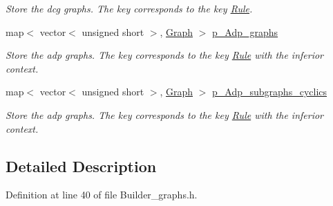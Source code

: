 \begin{DoxyCompactItemize}
\begin{DoxyCompactList}\small\item\em Store the dcg graphs. The key corresponds to the key \hyperlink{classgenevalmag_1_1Rule}{Rule}. \item\end{DoxyCompactList}\item 
map$<$ vector$<$ unsigned short $>$, \hyperlink{namespacegenevalmag_a4a96de9ebfc7d48233406ab9cad55cb5}{Graph} $>$ \hyperlink{classgenevalmag_1_1Builder__graphs_a75e37bb5a6f499fdd57f97061e313ec5}{p\_\-Adp\_\-graphs}
\begin{DoxyCompactList}\small\item\em Store the adp graphs. The key corresponds to the key \hyperlink{classgenevalmag_1_1Rule}{Rule} with the inferior context. \item\end{DoxyCompactList}\item 
map$<$ vector$<$ unsigned short $>$, \hyperlink{namespacegenevalmag_a4a96de9ebfc7d48233406ab9cad55cb5}{Graph} $>$ \hyperlink{classgenevalmag_1_1Builder__graphs_a54a45b424086582d4ed7bb99b948a956}{p\_\-Adp\_\-subgraphs\_\-cyclics}
\begin{DoxyCompactList}\small\item\em Store the adp graphs. The key corresponds to the key \hyperlink{classgenevalmag_1_1Rule}{Rule} with the inferior context. \item\end{DoxyCompactList}\end{DoxyCompactItemize}


\subsection{Detailed Description}


Definition at line 40 of file Builder\_\-graphs.h.



